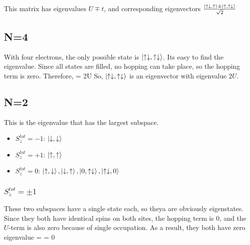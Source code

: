 \documentclass{article}
\begin{document}
This matrix has eigenvalues \(U \mp t\), and corresponding eigenvectors \(\frac{\ket{\uparrow\downarrow,\uparrow} \pm \ket{\uparrow,\uparrow\downarrow}}{\sqrt{2}}\)
\subsection{N=4}
With four electrons, the only possible state is \(\ket{\uparrow\downarrow,\uparrow\downarrow}\). Its easy to find the eigenvalue. Since all states are filled, no hopping can take place, so the hopping term is zero. Therefore,
\beq
\ham \ket{\uparrow\downarrow,\uparrow\downarrow} = 2U \ket{\uparrow\downarrow,\uparrow\downarrow}
\eeq
So, \(\ket{\uparrow\downarrow,\uparrow\downarrow}\) is an eigenvector with eigenvalue \(2U\).
\subsection{N=2}
This is the eigenvalue that has the largest subspace.
\begin{itemize}
\item \(S_z^{tot} = -1\): \(\ket{\downarrow,\downarrow}\)
\item \(S_z^{tot} = +1\): \(\ket{\uparrow,\uparrow}\)
\item \(S_z^{tot} = 0\):  \(\ket{\uparrow,\downarrow},\ket{\downarrow,\uparrow},\ket{0,\uparrow\downarrow},\ket{\uparrow\downarrow,0}\)
\end{itemize}

\subsubsection{\(S_z^{tot} = \pm 1\)}
These two subspaces have a single state each, so theya are obviously eigenstates. Since they both have identical spins on both sites, the hopping term is 0, and the \(U\)-term is also zero because of single occupation. As a result, they both have zero eigenvalue
\beq
\ham \ket{\downarrow,\downarrow} = \ham \ket{\uparrow,\uparrow} = 0
\eeq
\end{document}
